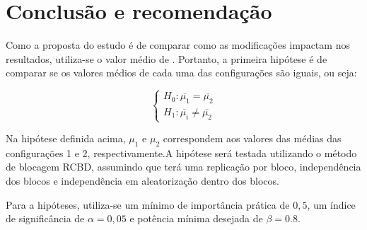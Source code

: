 \documentclass[
]{article}
\begin{document}
\hypertarget{conclusuxe3o-e-recomendauxe7uxe3o}{%
\section{Conclusão e
recomendação}\label{conclusuxe3o-e-recomendauxe7uxe3o}}

Como a proposta do estudo é de comparar como as modificações impactam
nos resultados, utiliza-se o valor médio de . Portanto, a primeira
hipótese é de comparar se os valores médios de cada uma das
configurações são iguais, ou seja:

\[
\begin{cases} H_0: \overline{\mu_1} = \overline{\mu_2}\\H_1: \overline{\mu_i} \neq \overline{\mu_2}\end{cases}
\]

Na hipótese definida acima, \(\mu_1\) e \(\mu_2\) correspondem aos
valores das médias das configurações 1 e 2, respectivamente.A hipótese
será testada utilizando o método de blocagem RCBD, assumindo que terá
uma replicação por bloco, independência dos blocos e independência em
aleatorização dentro dos blocos.

Para a hipóteses, utiliza-se um mínimo de importância prática de
\(0,5\), um índice de significância de \(\alpha = 0,05\) e potência
mínima desejada de \(\beta = 0.8\).
\end{document}
